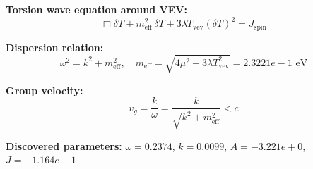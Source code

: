 
\textbf{Torsion wave equation around VEV:}
\begin{equation}
  \Box \delta T + m_{\text{eff}}^2 \, \delta T + 3\lambda T_{\text{vev}} (\delta T)^2 = J_{\text{spin}}
\end{equation}

\textbf{Dispersion relation:}
\begin{equation}
  \omega^2 = k^2 + m_{\text{eff}}^2, \quad
  m_{\text{eff}} = \sqrt{4\mu^2 + 3\lambda T_{\text{vev}}^2} = 2.3221e-1 \text{ eV}
\end{equation}

\textbf{Group velocity:}
\begin{equation}
  v_g = \frac{k}{\omega} = \frac{k}{\sqrt{k^2 + m_{\text{eff}}^2}} < c
\end{equation}

\textbf{Discovered parameters:}
$\omega = 0.2374$, \quad
$k = 0.0099$, \quad
$A = -3.221e+0$, \quad
$J = -1.164e-1$